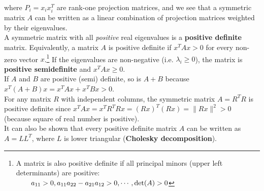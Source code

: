 \documentclass[11pt]{article}
\theoremstyle{plain}
\theoremstyle{definition}
\theoremstyle{remark}
\numberwithin{equation}{section}
\begin{document}
where $P_i = x_i x_i^T$ are rank-one projection matrices, and we see that a symmetric matrix $A$ can be written as a linear combination of projection matrices weighted by their eigenvalues.
\\




A symmetric matrix with all {\em positive} real eigenvalues is a {\bf positive definite} matrix. Equivalently, a matrix $A$ is positive definite if $x^T A x > 0$ for every non-zero vector $x$.\footnote{A matrix is also positive definite if all principal minors (upper left determinants) are positive:\\ $\text{ \quad \ \ } a_{11} > 0, a_{11} a_{22} - a_{21} a_{12} > 0, \cdots, \det(A) > 0$} If the eigenvalues are non-negative (i.e. $\lambda_i \geq 0$), the matrix is {\bf positive semidefinite} and $x^T A x \geq 0$.
\\



If $A$ and $B$ are positive (semi) definite, so is $A+B$ because $x^T (A + B) x = x^T A x + x^T B x > 0$.
\\

For any matrix $R$ with independent columns, the symmetric matrix $A = R^T R$ is positive definite since $x^T A x = x^T R^T Rx = (Rx)^T (Rx) = \| Rx \|^2 > 0$ (because square of real number is positive).
\\

It can also be shown that every positive definite matrix $A$ can be written as $A = L L^T$, where $L$ is lower triangular ({\bf Cholesky decomposition}).
\\


\end{document}
